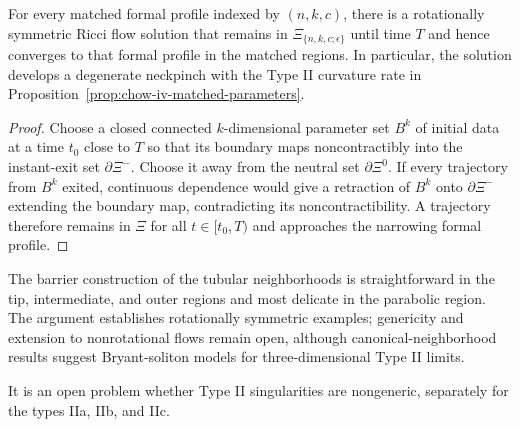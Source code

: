 \begin{theorem}
\label{thm:chow-iv-wazewski-degenerate-neckpinch}


For every matched formal profile indexed by $(n,k,c)$, there is a rotationally
symmetric Ricci flow solution that remains in
$\Xi_{\{n,k,c;\epsilon\}}$ until time $T$ and hence converges to that formal
profile in the matched regions.  In particular, the solution develops a
degenerate neckpinch with the Type II curvature rate in
Proposition~\ref{prop:chow-iv-matched-parameters}.
\end{theorem}
\begin{proof}
\sketch
Choose a closed connected $k$-dimensional parameter set $B^k$ of initial data
at a time $t_0$ close to $T$ so that its boundary maps noncontractibly into
the instant-exit set $\partial\Xi^-$.  Choose it away from the neutral set
$\partial\Xi^0$.  If every trajectory from $B^k$ exited, continuous dependence
would give a retraction of $B^k$ onto $\partial\Xi^-$ extending the boundary
map, contradicting its noncontractibility.  A trajectory therefore remains in
$\Xi$ for all $t\in[t_0,T)$ and approaches the narrowing formal profile.
\end{proof}

\begin{remark}
\label{rem:chow-iv-degenerate-neckpinch-scope}


The barrier construction of the tubular neighborhoods is straightforward in
the tip, intermediate, and outer regions and most delicate in the parabolic
region.  The argument establishes rotationally symmetric examples; genericity
and extension to nonrotational flows remain open, although canonical-neighborhood
results suggest Bryant-soliton models for three-dimensional Type II limits.
\end{remark}

\begin{remark}
\label{rem:chow-iv-type-ii-genericity-problem}
It is an open problem whether Type II singularities are nongeneric, separately
for the types IIa, IIb, and IIc.
\end{remark}
